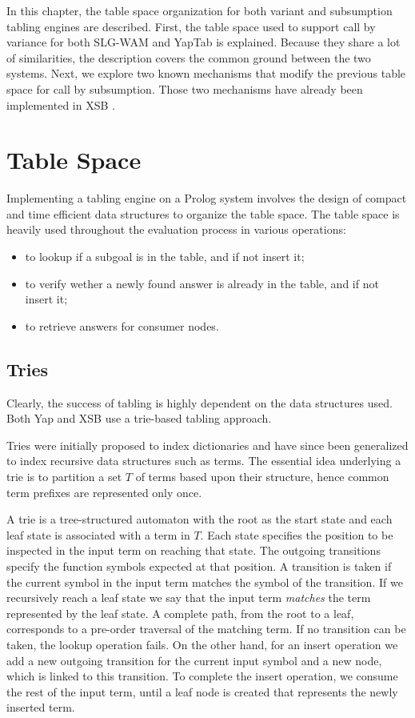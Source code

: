 
In this chapter, the table space organization for both variant and subsumption tabling engines are described.
First, the table space used to support call by variance for both SLG-WAM and YapTab is explained. Because
they share a lot of similarities, the description covers the common ground between the two systems.
Next, we explore two known mechanisms that
modify the previous table space for call by subsumption. Those two mechanisms have already been implemented in XSB
\cite{Rao-96, Johnson-99}.

\section{Table Space} \label{sec:table_space}

Implementing a tabling engine on a Prolog system involves the design of compact and time efficient data structures
to organize the table space. The table space is heavily used throughout the evaluation process in various operations:

\begin{itemize}
  \item to lookup if a subgoal is in the table, and if not insert it;
  \item to verify wether a newly found answer is already in the table, and if not insert it;
  \item to retrieve answers for consumer nodes.
\end{itemize}

\subsection{Tries}

Clearly, the success of tabling is highly dependent on the data structures used.
Both Yap \cite{Rocha-00a} and XSB \cite{RamakrishnanIV-95} use a trie-based tabling approach.

Tries were initially proposed to index dictionaries \cite{Fredkin-62} and have since been generalized to index recursive data structures
such as terms. The essential idea underlying a trie is to partition a set $T$ of terms based upon their structure,
hence common term prefixes are represented only once.

A trie is a tree-structured automaton with the root as the start state and each leaf state is associated with a term in $T$.
Each state specifies the position to be inspected in the input term on reaching that state.
The outgoing transitions specify the function symbols expected at that position.
A transition is taken if the current symbol in the input term matches the symbol of the transition.
If we recursively reach a leaf state we say that the input term \textit{matches} the term represented by the leaf state.
A complete path, from the root to a leaf, corresponds to a pre-order traversal of the matching term.
If no transition can be taken, the lookup operation fails. On the other hand, for an insert operation
we add a new outgoing transition for the current input symbol and a new node, which is linked to this transition.
To complete the insert operation, we consume the rest of the input term, until a leaf node is created that represents
the newly inserted term.

